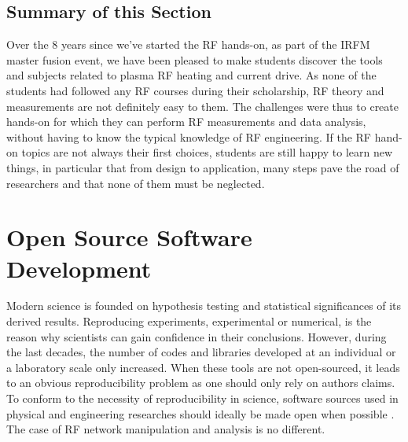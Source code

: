 \subsection{Summary of this Section}
Over the 8 years since we’ve started the RF hands-on, as part of the IRFM master fusion event, we have been pleased to make students discover the tools and subjects related to plasma RF heating and current drive. As none of the students had followed any RF courses during their scholarship, RF theory and measurements are not definitely easy to them. The challenges were thus to create hands-on for which they can perform RF measurements and data analysis, without having to know the typical knowledge of RF engineering. If the RF hand-on topics are not always their first choices, students are still happy to learn new things, in particular that from design to application, many steps pave the road of researchers and that none of them must be neglected. 



\clearpage
\section[Open Source Software]{Open Source Software Development}\label{sec:OSS}

Modern science is founded on hypothesis testing and statistical significances of its derived results. Reproducing experiments, experimental or numerical, is the reason why scientists can gain confidence in their conclusions. However, during the last decades, the number of codes and libraries developed at an individual or a laboratory scale only increased. When these tools are not open-sourced, it leads to an obvious reproducibility problem as one should only rely on authors claims. To conform to the necessity of reproducibility in science,  software sources used in physical and engineering researches should ideally be made open when possible . The case of RF network manipulation and analysis is no different.  

